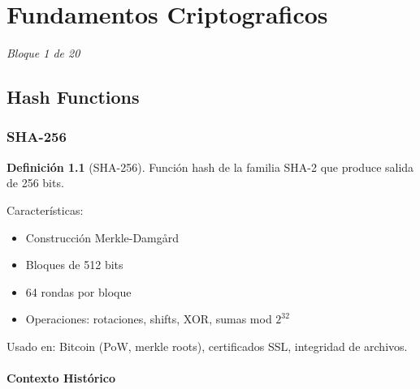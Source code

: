 \documentclass[11pt,a4paper,twoside,openright]{book}
\theoremstyle{definition}
\newtheorem{definition}{Definición}[chapter]
\theoremstyle{plain}
\theoremstyle{remark}
\begin{document}
\vfill
\cleardoublepage

\tableofcontents
\cleardoublepage

\mainmatter

\chapter{Fundamentos Criptograficos}
\label{ch:bloque1}

\begin{center}
\textit{Bloque 1 de 20}
\end{center}

\section{Hash Functions}


\subsection{SHA-256}

\begin{definition}[SHA-256]
Función hash de la familia SHA-2 que produce salida de 256 bits.
\end{definition}

Características:
\begin{itemize}
    \item Construcción Merkle-Damgård
    \item Bloques de 512 bits
    \item 64 rondas por bloque
    \item Operaciones: rotaciones, shifts, XOR, sumas mod $2^{32}$
\end{itemize}

Usado en: Bitcoin (PoW, merkle roots), certificados SSL, integridad de archivos.

\subsubsection{Contexto Histórico}
\end{document}

